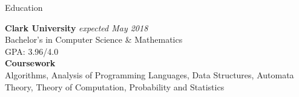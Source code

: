 \documentclass{resume} %
\begin{document}

\begin{rSection}{Education}

\begin{multicols}{2}

{\bf Clark University} \hfill {\em expected May 2018} \\ 
Bachelor's in Computer Science \& Mathematics \\
GPA: 3.96/4.0  \smallskip \\
\vfill
\columnbreak
\textbf{Coursework} \\ Algorithms, Analysis of Programming Languages, Data Structures, Automata Theory, Theory of Computation, Probability and Statistics

\end{multicols}

\end{rSection}

\end{document}
